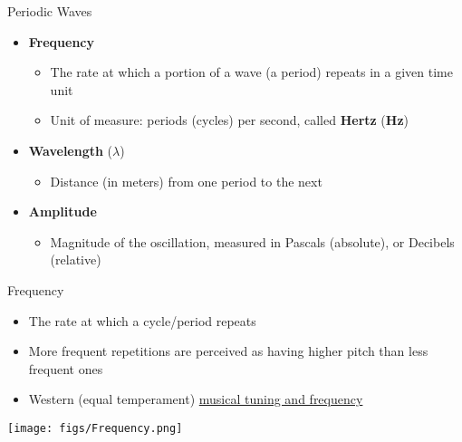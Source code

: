 \documentclass[professionalfonts]{beamer}
\begin{document}
\begin{frame}{Periodic Waves}
    \begin{itemize}
        \item \textbf{Frequency} 
        \begin{itemize}
            \item The rate at which a portion of a wave (a period) repeats in a given time unit 
            \item Unit of measure: periods (cycles) per second, called \textbf{Hertz} (\textbf{Hz})
        \end{itemize}
        \item \textbf{Wavelength} ($\lambda$)
        \begin{itemize}
            \item Distance (in meters) from one period to the next
        \end{itemize}
        \item \textbf{Amplitude}
        \begin{itemize}
            \item Magnitude of the oscillation, measured in Pascals (absolute), or Decibels (relative)
        \end{itemize}
    \end{itemize}
\end{frame}

\begin{frame}{Frequency}
    \begin{multicols}{2}
        \begin{itemize}
            \item The rate at which a cycle/period repeats
            \item More frequent repetitions are perceived as having higher pitch than less frequent ones
            \item Western (equal temperament) \href{https://mixbutton.com/music-tools/frequency-and-pitch/music-note-to-frequency-chart}{musical tuning and frequency}
        \end{itemize}

        \columnbreak

        \begin{center}
            \texttt{[image: figs/Frequency.png]}
        \end{center}
    \end{multicols}
\end{frame}
\end{document}
